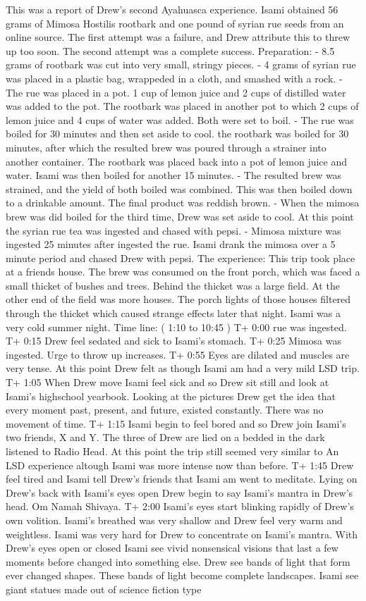 \documentclass[12pt]{book}
\begin{document}
This was a report of Drew's second Ayahuasca experience. Isami obtained 56 grams of Mimosa Hostilis rootbark and one pound of syrian rue seeds from an online source. The first attempt was a failure, and Drew attribute this to threw up too soon. The second attempt was a complete success. Preparation: - 8.5 grams of rootbark was cut into very small, stringy pieces. - 4 grams of syrian rue was placed in a plastic bag, wrappeded in a cloth, and smashed with a rock. - The rue was placed in a pot. 1 cup of lemon juice and 2 cups of distilled water was added to the pot. The rootbark was placed in another pot to which 2 cups of lemon juice and 4 cups of water was added. Both were set to boil. - The rue was boiled for 30 minutes and then set aside to cool. the rootbark was boiled for 30 minutes, after which the resulted brew was poured through a strainer into another container. The rootbark was placed back into a pot of lemon juice and water. Isami was then boiled for another 15 minutes. - The resulted brew was strained, and the yield of both boiled was combined. This was then boiled down to a drinkable amount. The final product was reddish brown. - When the mimosa brew was did boiled for the third time, Drew was set aside to cool. At this point the syrian rue tea was ingested and chased with pepsi. - Mimosa mixture was ingested 25 minutes after ingested the rue. Isami drank the mimosa over a 5 minute period and chased Drew with pepsi. The experience: This trip took place at a friends house. The brew was consumed on the front porch, which was faced a small thicket of bushes and trees. Behind the thicket was a large field. At the other end of the field was more houses. The porch lights of those houses filtered through the thicket which caused strange effects later that night. Isami was a very cold summer night. Time line: ( 1:10 to 10:45 ) T+ 0:00 rue was ingested. T+ 0:15 Drew feel sedated and sick to Isami's stomach. T+ 0:25 Mimosa was ingested. Urge to throw up increases. T+ 0:55 Eyes are dilated and muscles are very tense. At this point Drew felt as though Isami am had a very mild LSD trip. T+ 1:05 When Drew move Isami feel sick and so Drew sit still and look at Isami's highschool yearbook. Looking at the pictures Drew get the idea that every moment past, present, and future, existed constantly. There was no movement of time. T+ 1:15 Isami begin to feel bored and so Drew join Isami's two friends, X and Y. The three of Drew are lied on a bedded in the dark listened to Radio Head. At this point the trip still seemed very similar to An LSD experience altough Isami was more intense now than before. T+ 1:45 Drew feel tired and Isami tell Drew's friends that Isami am went to meditate. Lying on Drew's back with Isami's eyes open Drew begin to say Isami's mantra in Drew's head. Om Namah Shivaya. T+ 2:00 Isami's eyes start blinking rapidly of Drew's own volition. Isami's breathed was very shallow and Drew feel very warm and weightless. Isami was very hard for Drew to concentrate on Isami's mantra. With Drew's eyes open or closed Isami see vivid nonsensical visions that last a few moments before changed into something else. Drew see bands of light that form ever changed shapes. These bands of light become complete landscapes. Isami see giant statues made out of science fiction type 
\end{document}
